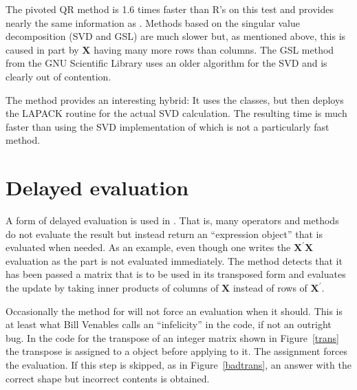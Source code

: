 \documentclass[shortnames,article]{jss}
\begin{document}
The pivoted QR method is 1.6 times faster than R's  on
this test and provides nearly the same information as .
Methods based on the singular value decomposition (SVD and GSL) are
much slower but, as mentioned above, this is caused in part by $\bm X$
having many more rows than columns.  The GSL method from the GNU
Scientific Library uses an older algorithm for the SVD and is clearly
out of contention.

The  method provides an interesting hybrid: It uses the
 classes, but then deploys the LAPACK routine  for
the actual SVD calculation. The resulting time is much faster than using the
SVD implementation of  which is not a particularly fast method.


\section{Delayed evaluation}
\label{sec:delayed}

A form of delayed evaluation is used in .  That is, many
operators and methods do not evaluate the result but instead return an
``expression object'' that is evaluated when needed.  As an example,
even though one writes the $\bm X^\prime\bm X$ evaluation as
 the  part is not
evaluated immediately.  The  method detects that it
has been passed a matrix that is to be used in its transposed form and
evaluates the update by taking inner products of columns of $\bm X$
instead of rows of $\bm X^\prime$.

Occasionally the method for  will not force an
evaluation when it should.  This is at least what Bill Venables calls
an ``infelicity'' in the code, if not an outright bug.  In the code
for the transpose of an integer matrix shown in Figure~\ref{trans} the
transpose is assigned to a  object before applying
 to it.  The assignment forces the evaluation.  If this
step is skipped, as in Figure~\ref{badtrans}, an answer with the correct
shape but incorrect contents is obtained.
\end{document}
